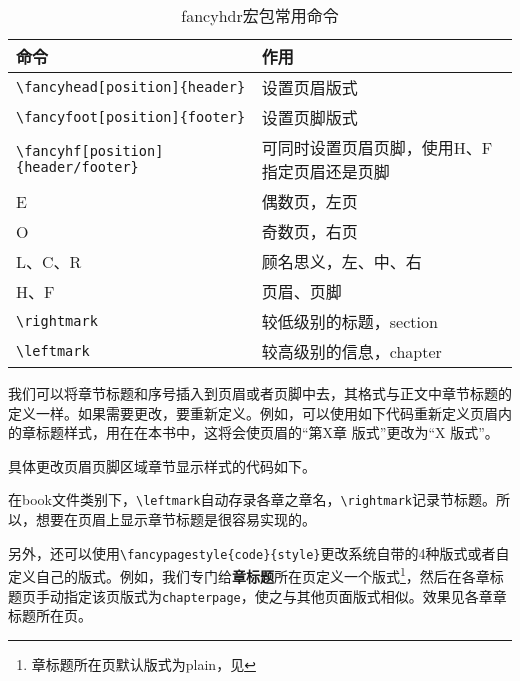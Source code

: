 \begin{table}
    \caption{fancyhdr宏包常用命令}
    \label{fancyhdr-tabular}
\begin{tabular}{ll}
    \toprule
    命令 & 作用\\
    \midrule
    \lstinline|\fancyhead[position]{header}| & 设置页眉版式\\
    \lstinline|\fancyfoot[position]{footer}| & 设置页脚版式\\
    \lstinline|\fancyhf[position]{header/footer}| & 可同时设置页眉页脚，使用H、F指定页眉还是页脚\\
    E & 偶数页，左页\\
    O & 奇数页，右页\\
    L、C、R & 顾名思义，左、中、右\\
    H、F & 页眉、页脚\\
    \lstinline|\rightmark| & 较低级别的标题，section\\
    \lstinline|\leftmark| & 较高级别的信息，chapter\\
    \bottomrule
\end{tabular}
\end{table}

我们可以将章节标题和序号插入到页眉或者页脚中去，其格式与正文中章节标题的定义一样。如果需要更改，要重新定义。例如，可以使用如下代码重新定义页眉内的章标题样式，用在在本书中，这将会使页眉的“第X章 版式”更改为“X 版式”。

具体更改页眉页脚区域章节显示样式的代码如下。

\begin{latex}
\renewcommand{\chaptermark}[1]{\markleft{\thesection.\#1}}
\renewcommand{\chaptermark}[1]{\markboth{\thechapter.\ #1}{节样式空置表示修改章样式}}
\renewcommand{\chaptermark}[1]{\markboth{章样式}{节样式}}
\end{latex}

在book文件类别下，\lstinline|\leftmark|自动存录各章之章名，\lstinline|\rightmark|记录节标题。所以，想要在页眉上显示章节标题是很容易实现的。

\begin{latex}
\lhead{\leftmark}%
\rhead{\rightmark}%
\end{latex}

另外，还可以使用\lstinline|\fancypagestyle{code}{style}|更改系统自带的4种版式或者自定义自己的版式。例如，我们专门给\textbf{章标题}所在页定义一个版式\footnote{章标题所在页默认版式为plain，见}，然后在各章标题页手动指定该页版式为\lstinline|chapterpage|，使之与其他页面版式相似。效果见各章章标题所在页。

